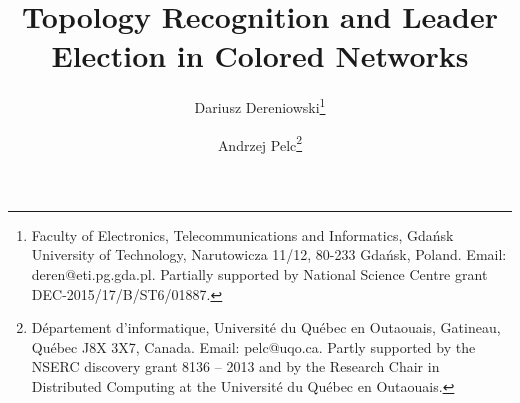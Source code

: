 \documentclass[a4paper,10pt]{article}
\begin{document}
\title{Topology Recognition and Leader Election in Colored Networks}

\author{Dariusz Dereniowski\thanks{Faculty of Electronics, Telecommunications and Informatics, Gda{\'n}sk University of Technology, Narutowicza 11/12, 80-233 Gda\'{n}sk, Poland. Email: deren@eti.pg.gda.pl. Partially supported by National Science Centre grant DEC-2015/17/B/ST6/01887.}
\and
Andrzej Pelc\thanks{D\'epartement d'informatique, Universit\'e du Qu\'ebec en Outaouais, Gatineau, Qu\'ebec J8X 3X7, Canada. Email: pelc@uqo.ca. Partly supported by the NSERC discovery grant 8136 -- 2013 and by the Research Chair in Distributed Computing at the Universit\'e du Qu\'ebec en Outaouais.}
}

\date{}
\maketitle
\end{document}
